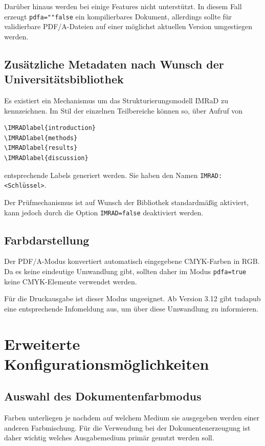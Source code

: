 \documentclass[
	ngerman,%
	accentcolor=9c,%
]{tudapub}
\newcommand*{\code}[1]{\texttt{#1}}
\newcommand*{\cls}[1]{\textsf{#1}}
\begin{document}
Darüber hinaus werden bei  einige Features nicht unterstützt. In diesem Fall erzeugt \code{pdfa=""false} ein kompilierbares Dokument, allerdings sollte für validierbare PDF/A-Dateien auf  einer möglichst aktuellen Version umgestiegen werden.

\subsection{Zusätzliche Metadaten nach Wunsch der Universitätsbibliothek}
\label{sec:IMRAD}
Es existiert ein Mechanismus um das Strukturierungsmodell IMRaD \cite{imrad} zu kennzeichnen.
Im Stil der einzelnen Teilbereiche können so, über Aufruf von

\begin{verbatim}
\IMRADlabel{introduction}
\IMRADlabel{methods}
\IMRADlabel{results}
\IMRADlabel{discussion}
\end{verbatim}
entsprechende Labels generiert werden. Sie haben den Namen \code{IMRAD:<Schlüssel>}.

Der Prüfmechanismus ist auf Wunsch der Bibliothek standardmäßig aktiviert, kann jedoch durch die Option \code{IMRAD=false} deaktiviert werden.

\subsection{Farbdarstellung}
\label{sec:pdfa-color}
Der PDF/A-Modus konvertiert automatisch eingegebene CMYK-Farben in RGB. Da es keine eindeutige Umwandlung gibt, sollten daher im Modus \code{pdfa=true} keine CMYK-Elemente verwendet werden.

Für die Druckausgabe ist dieser Modus ungeeignet. Ab Version 3.12 gibt \cls{tudapub} eine entsprechende Infomeldung aus, um über diese Umwandlung zu informieren.

\section{Erweiterte Konfigurationsmöglichkeiten}

\subsection{Auswahl des Dokumentenfarbmodus}
Farben unterliegen je nachdem auf welchem Medium sie ausgegeben werden einer anderen Farbmischung. Für die Verwendung bei der Dokumentenerzeugung ist daher wichtig welches Ausgabemedium primär genutzt werden soll.
\end{document}
